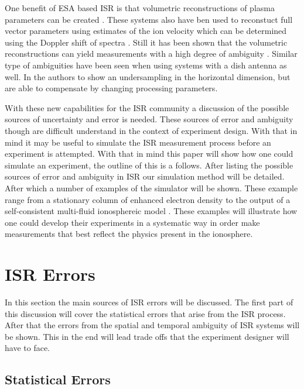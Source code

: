 \documentclass[draft,ras]{agutex}
\begin{document}
\begin{article}
One benefit of ESA based ISR is that volumetric reconstructions of plasma parameters can be created \citep{Semeter2009738, Nicolls:2007ie, dahlgren2012di}. These systems also have ben used to reconstuct full vector parameters using estimates of the ion velocity which can be determined using the Doppler shift of spectra \citep{butler:imagingfregiondrifts,RDS:RDS20195}. Still it has been shown that the volumetric reconstructions can yield measurements with a high degree of ambiguity \citep{Dahlgren:2012dq}. Similar type of ambiguities have been seen when using systems with a dish antenna as well. In \citet{Semeter:2005fo} the authors to show an undersampling in the horizontal dimension, but are able to compensate by changing processing parameters.

With these new capabilities for the ISR community a discussion of the possible sources of uncertainty and error is needed. These sources of error and ambiguity though are difficult understand in the context of experiment design. With that in mind it may be useful to simulate the ISR measurement process before an experiment is attempted. With that in mind this paper will show how one could simulate an experiment, the outline of this is a follows. After listing the possible sources of error and ambiguity in ISR our simulation method will be detailed. After which  a number of examples of the simulator will be shown. These example range from a stationary column of enhanced electron density to the output of a self-consistent multi-fluid ionosphereic model \citep{semeter:plasmatransport2012}. These examples will illustrate how one could develop their experiments in a systematic way in order make measurements that best reflect the physics present in the ionosphere.

\section{ISR Errors}

In this section the main sources of ISR errors will be discussed. The first part of this discussion will cover the statistical errors that arise from the ISR process. After that the errors from the spatial and temporal ambiguity of ISR systems will be shown. This in the end will lead trade offs that the experiment designer will have to face.

\subsection{Statistical Errors}


\end{article}
\end{document}
